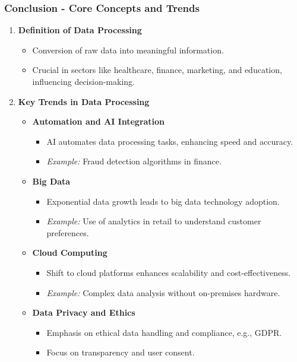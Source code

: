 \documentclass[aspectratio=169]{beamer}
\begin{document}
\begin{frame}[fragile]
    \frametitle{Conclusion - Core Concepts and Trends}
    \begin{enumerate}
        \item \textbf{Definition of Data Processing}
        \begin{itemize}
            \item Conversion of raw data into meaningful information.
            \item Crucial in sectors like healthcare, finance, marketing, and education, influencing decision-making.
        \end{itemize}
        
        \item \textbf{Key Trends in Data Processing}
        \begin{itemize}
            \item \textbf{Automation and AI Integration}
            \begin{itemize}
                \item AI automates data processing tasks, enhancing speed and accuracy.
                \item \textit{Example:} Fraud detection algorithms in finance.
            \end{itemize}
            \item \textbf{Big Data}
            \begin{itemize}
                \item Exponential data growth leads to big data technology adoption.
                \item \textit{Example:} Use of analytics in retail to understand customer preferences.
            \end{itemize}
            \item \textbf{Cloud Computing}
            \begin{itemize}
                \item Shift to cloud platforms enhances scalability and cost-effectiveness.
                \item \textit{Example:} Complex data analysis without on-premises hardware.
            \end{itemize}
            \item \textbf{Data Privacy and Ethics}
            \begin{itemize}
                \item Emphasis on ethical data handling and compliance, e.g., GDPR.
                \item Focus on transparency and user consent.
            \end{itemize}
        \end{itemize}
    \end{enumerate}
\end{frame}
\end{document}
